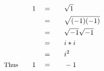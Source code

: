 \begin{alignat*}{5}
&\,&1\quad&=\quad&&\sqrt{1}\\
&\,&\,&=&&\sqrt{(-1)(-1)}\\
&\,&\,&=&&\sqrt{-1}\sqrt{-1}\\
&\,&\,&=&&i*i\\
&\,&\,&=&&i^2\\
&\small\text{Thus}\normalsize\quad&1\quad&=&&-1
\end{alignat*}
